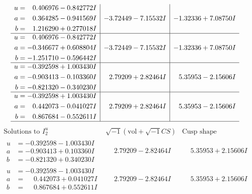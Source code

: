 \documentclass[1p]{elsarticle_modified}
\theoremstyle{definition}
\newcommand{\I}{\sqrt{-1}}
\begin{document}
$$\begin{array}{c|c|c}
\begin{aligned}
u &= \phantom{-}0.406976 - 0.842772 I \\
a &= \phantom{-}0.364285 - 0.941569 I \\
b &= \phantom{-}1.216290 + 0.277018 I\end{aligned}
 & -3.72449 - 7.15532 I & -1.32336 + 7.08750 I \\ \hline\begin{aligned}
u &= \phantom{-}0.406976 - 0.842772 I \\
a &= -0.346677 + 0.608804 I \\
b &= -1.251710 - 0.596442 I\end{aligned}
 & -3.72449 - 7.15532 I & -1.32336 + 7.08750 I \\ \hline\begin{aligned}
u &= -0.392598 + 1.003430 I \\
a &= -0.903413 - 0.103360 I \\
b &= -0.821320 - 0.340230 I\end{aligned}
 & \phantom{-}2.79209 + 2.82464 I & \phantom{-}5.35953 - 2.15606 I \\ \hline\begin{aligned}
u &= -0.392598 + 1.003430 I \\
a &= \phantom{-}0.442073 - 0.041027 I \\
b &= \phantom{-}0.867684 - 0.552611 I\end{aligned}
 & \phantom{-}2.79209 + 2.82464 I & \phantom{-}5.35953 - 2.15606 I\\
 \hline 
 \end{array}$$\newpage$$\begin{array}{c|c|c}  
\text{Solutions to }I^u_{2}& \I (\text{vol} + \sqrt{-1}CS) & \text{Cusp shape}\\
 \hline 
\begin{aligned}
u &= -0.392598 - 1.003430 I \\
a &= -0.903413 + 0.103360 I \\
b &= -0.821320 + 0.340230 I\end{aligned}
 & \phantom{-}2.79209 - 2.82464 I & \phantom{-}5.35953 + 2.15606 I \\ \hline\begin{aligned}
u &= -0.392598 - 1.003430 I \\
a &= \phantom{-}0.442073 + 0.041027 I \\
b &= \phantom{-}0.867684 + 0.552611 I\end{aligned}
 & \phantom{-}2.79209 - 2.82464 I & \phantom{-}5.35953 + 2.15606 I \\ \hline\begin{aligned}

\end{aligned}
\end{array}$$
\end{document}

